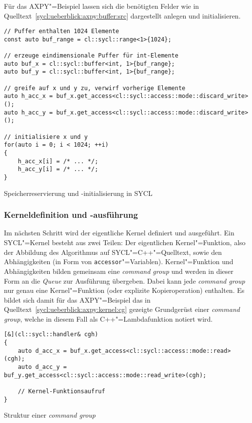 Für das AXPY"=Beispiel lassen sich die benötigten Felder wie in
Quelltext~\ref{sycl:ueberblick:axpy:buffer:src} dargestellt anlegen und
initialisieren.
%
\begin{code}
    \begin{verbatim}
// Puffer enthalten 1024 Elemente
const auto buf_range = cl::sycl::range<1>{1024};

// erzeuge eindimensionale Puffer für int-Elemente
auto buf_x = cl::sycl::buffer<int, 1>{buf_range};
auto buf_y = cl::sycl::buffer<int, 1>{buf_range};

// greife auf x und y zu, verwirf vorherige Elemente
auto h_acc_x = buf_x.get_access<cl::sycl::access::mode::discard_write>();
auto h_acc_y = buf_x.get_access<cl::sycl::access::mode::discard_write>();

// initialisiere x und y
for(auto i = 0; i < 1024; ++i)
{
    h_acc_x[i] = /* ... */;
    h_acc_y[i] = /* ... */;
}
    \end{verbatim}
    \caption{Speicherreservierung und -initialisierung in SYCL}
    \label{sycl:ueberblick:axpy:buffer:src}
\end{code}

\subsubsection{Kerneldefinition und -ausführung}
\label{sycl:ueberblick:axpy:kernel}

Im nächsten Schritt wird der eigentliche Kernel definiert und ausgeführt. Ein
SYCL"=Kernel besteht aus zwei Teilen: Der eigentlichen Kernel"=Funktion, also
der Abbildung des Algorithmus auf SYCL"=C++"=Quelltext, sowie den Abhängigkeiten
(in Form von \texttt{accessor}"=Variablen). Kernel"=Funktion und Abhängigkeiten
bilden gemeinsam eine \textit{command group} und werden in dieser Form an die
\textit{Queue} zur Ausführung übergeben. Dabei kann jede \textit{command group}
nur genau eine Kernel"=Funktion (oder explizite Kopieroperation) enthalten. Es
bildet sich damit für das AXPY"=Beispiel das in
Quelltext~\ref{sycl:ueberblick:axpy:kernel:cg} gezeigte Grundgerüst einer
\textit{command group}, welche in diesem Fall als C++"=Lambdafunktion notiert
wird.

\begin{code}
    \begin{verbatim}
[&](cl::sycl::handler& cgh)
{
    auto d_acc_x = buf_x.get_access<cl::sycl::access::mode::read>(cgh);
    auto d_acc_y = buf_y.get_access<cl::sycl::access::mode::read_write>(cgh);

    // Kernel-Funktionsaufruf
}
    \end{verbatim}
    \caption{Struktur einer \textit{command group}}
    \label{sycl:ueberblick:axpy:kernel:cg}
\end{code}


